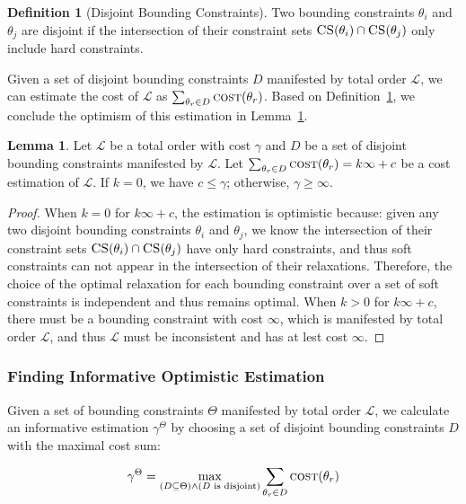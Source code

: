 \documentclass[letterpaper]{article} %
\theoremstyle{definition}
\newtheorem{definition}{Definition}
\newtheorem{lemma}{Lemma}
\newcommand{\LE}{\mathcal{L}}
\begin{document}
\begin{definition}[Disjoint Bounding Constraints]\label{def:disjoint}
Two bounding constraints $\theta_i$ and $\theta_j$ are disjoint if the intersection of their constraint sets $\textsc{CS}(\theta_i) \cap \textsc{CS}(\theta_j)$ only include hard constraints.
\end{definition}

Given a set of disjoint bounding constraints $D$ manifested by total order $\LE$, we can estimate the cost of $\LE$ as $\sum_{\theta_r \in D} \textsc{cost}(\theta_r)$. Based on Definition~\ref{def:disjoint}, we conclude the optimism of this estimation in Lemma~\ref{lemma:optimistic}.

\begin{lemma}\label{lemma:optimistic}
Let $\LE$ be a total order with cost $\gamma$ and $D$ be a set of disjoint bounding constraints manifested by $\LE$. Let $\sum_{\theta_r \in D} \textsc{cost}(\theta_r) = k\infty+c$ be a cost estimation of $\LE$. If $k = 0$, we have $c \leq \gamma$; otherwise, $\gamma \geq \infty$.
\end{lemma}

\begin{proof}

When $k = 0$ for $k\infty + c$, the estimation is optimistic because: given any two disjoint bounding constraints $\theta_i$ and $\theta_j$, we know the intersection of their constraint sets $\textsc{CS}(\theta_i) \cap \textsc{CS}(\theta_j)$ have only hard constraints, and thus soft constraints can not appear in the intersection of their relaxations. Therefore, the choice of the optimal relaxation for each bounding constraint over a set of soft constraints is independent and thus remains optimal. When $k > 0$ for $k\infty + c$, there must be a bounding constraint with cost $\infty$, which is manifested by total order $\LE$, and thus $\LE$ must be inconsistent and has at lest cost $\infty$.
\end{proof} 

\subsubsection{Finding Informative Optimistic Estimation}
Given a set of bounding constraints $\Theta$ manifested by total order $\mathcal{L}$, we calculate an informative estimation $\gamma^{\Theta}$  by choosing a set of disjoint bounding constraints $D$ with the maximal cost sum:

\begin{equation}\label{eq:disjoint}
    \gamma^{\Theta} = \max_{(D \subseteq \Theta) \land (D \text{ is disjoint})} \sum_{\theta_r \in D} \textsc{cost}(\theta_r)
\end{equation}
\end{document}
